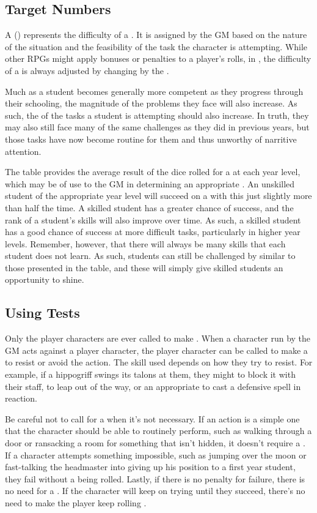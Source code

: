 \subsection{Target Numbers}

A {\targetnumber} ({\tn}) represents the difficulty of a {\test}.
It is assigned by the GM based on the nature of the situation and the feasibility of the task the character is attempting.
While other RPGs might apply bonuses or penalties to a player's rolls, in , the difficulty of a {\test} is always adjusted by changing by the {\tn}.

Much as a student becomes generally more competent as they progress through their schooling, the magnitude of the problems they face will also increase.
As such, the {\tns} of the tasks a student is attempting should also increase.
In truth, they may also still face many of the same challenges as they did in previous years, but those tasks have now become routine for them and thus unworthy of narritive attention.

The  table provides the average result of the dice rolled for a {\test} at each year level, which may be of use to the GM in determining an appropriate {\tn}.
An unskilled student of the appropriate year level will succeed on a {\test} with this {\tn} just slightly more than half the time.
A skilled student has a greater chance of success, and the rank of a student's skills will also improve over time.
As such, a skilled student has a good chance of success at more difficult tasks, particularly in higher year levels.
Remember, however, that there will always be many skills that each student does not learn.
As such, students can still be challenged by {\tns} similar to those presented in the table, and these will simply give skilled students an opportunity to shine.

\subsection{Using Tests}

Only the player characters are ever called to make {\tests}.
When a character run by the GM acts against a player character, the player character can be called to make a {\test} to resist or avoid the action.
The skill used depends on how they try to resist.
For example, if a hippogriff swings its talons at them, they might {\test}  to block it with their staff, {\test}  to leap out of the way, or {\test} an appropriate {\magicskill} to cast a defensive spell in reaction.

Be careful not to call for a {\test} when it's not necessary.
If an action is a simple one that the character should be able to routinely perform, such as walking through a door or ransacking a room for something that isn't hidden, it doesn't require a {\test}.
If a character attempts something impossible, such as jumping over the moon or fast-talking the headmaster into giving up his position to a first year student, they fail without a {\test} being rolled.
Lastly, if there is no penalty for failure, there is no need for a {\test}.
If the character will keep on trying until they succeed, there's no need to make the player keep rolling {\tests}.
